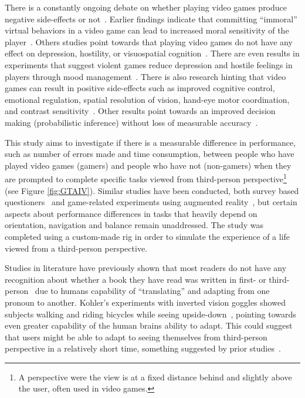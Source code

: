 \documentclass[runningheads,a4paper,oribibl]{llncs}
\begin{document}
There is a constantly ongoing debate on whether playing video games produce negative side-effects or not~\cite{tear2014video}. Earlier findings indicate that committing ``immoral'' virtual behaviors in a video game can lead to increased moral sensitivity of the player~\cite{grizzard2014being}. Others studies point towards that playing video games do not have any effect on depression, hostility, or visuospatial cognition~\cite{valadez2012just}. There are even results in experiments that suggest violent games reduce depression and hostile feelings in players through mood management~\cite{ferguson2015hitman}. There is also research hinting that video games can result in positive side-effects such as improved cognitive control, emotional regulation, spatial resolution of vision, hand-eye motor coordination, and contrast sensitivity~\cite{gong2015enhanced}. Other results point towards an improved decision making (probabilistic inference) without loss of measurable accuracy~\cite{green2010improved}.

This study aims to investigate if there is a measurable difference in performance, such as number of errors made and time consumption, between people who have played video games (gamers) and people who have not (non-gamers) when they are prompted to complete specific tasks viewed from third-person perspective\footnote{A perspective were the view is at a fixed distance behind and slightly above the user, often used in video games.} (see Figure \ref{fig:GTAIV}). Similar studies have been conducted, both survey based questioners~\cite{schmierbach2011exploring} and game-related experiments using augmented reality~\cite{nakamura20103pi}, but certain aspects about performance differences in tasks that heavily depend on orientation, navigation and balance remain unaddressed. The study was completed using a custom-made rig in order to simulate the experience of a life viewed from a third-person perspective.

Studies in literature have previously shown that most readers do not have any recognition about whether a book they have read was written in first- or third-person~\cite{hagg2012nya} due to humans capability of ``translating'' and adapting from one pronoun to another. Kohler's experiments with inverted vision goggles showed subjects walking and riding bicycles while seeing upside-down~\cite{kohler1962goggles}, pointing towards even greater capability of the human brains ability to adapt. This could suggest that users might be able to adapt to seeing themselves from third-person perspective in a relatively short time, something suggested by prior studies~\cite{nakamura20103pi}.
\end{document}

